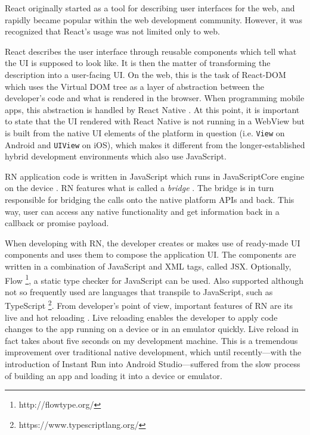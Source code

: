 React originally started as a tool for describing user interfaces for the web, and rapidly became popular within the web development community. However, it was recognized that React's usage was not limited only to web.

React describes the user interface through reusable components which tell what the UI is supposed to look like. It is then the matter of transforming the description into a user-facing UI. On the web, this is the task of React-DOM \cite{learningRN} which uses the Virtual DOM tree as a layer of abstraction between the developer's code and what is rendered in the browser. When programming mobile apps, this abstraction is handled by React Native \cite{learningRN}. At this point, it is important to state that the UI rendered with React Native is not running in a WebView but is built from the native UI elements of the platform in question (i.e. \texttt{View} on Android and \texttt{UIView} on iOS), which makes it different from the longer-established hybrid development environments which also use JavaScript. 

RN application code is written in JavaScript which runs in JavaScriptCore engine on the device \cite{rn:jsenviroment}. RN features what is called a \textit{bridge} \cite{rn:bridge}. The bridge is in turn responsible for bridging the calls onto the native platform APIs and back. This way, user can access any native functionality and get information back in a callback or promise payload.

When developing with RN, the developer creates or makes use of ready-made UI components and uses them to compose the application UI. The components are written in a combination of JavaScript and XML tags, called JSX. Optionally, Flow \footnote{http://flowtype.org/}, a static type checker for JavaScript can be used. Also supported although not so frequently used are languages that transpile to JavaScript, such as TypeScript \footnote{https://www.typescriptlang.org/}. From developer's point of view, important features of RN are its live and hot reloading \cite{rn:hotreload}. Live reloading  enables the developer to apply code changes to the app running on a device or in an emulator quickly. Live reload in fact takes about five seconds on my development machine. This is a tremendous improvement over traditional native development, which until recently---with the introduction of Instant Run into Android Studio---suffered from the slow process of building an app and loading it into a device or emulator.

